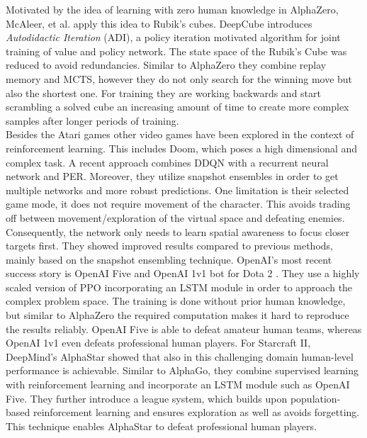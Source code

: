     Motivated by the idea of learning with zero human knowledge in AlphaZero, McAleer, et al. \cite{McAleer2018} apply this idea to Rubik's cubes. 
    DeepCube introduces \textit{Autodidactic Iteration} (ADI), a policy iteration motivated algorithm for joint training of value and policy network.
    The state space of the Rubik's Cube was reduced to avoid redundancies.
    Similar to AlphaZero they combine replay memory and MCTS, however they do not only search for the winning move but also the shortest one.
    For training they are working backwards and start scrambling a solved cube an increasing amount of time to create more complex samples after longer periods of training.\\
    Besides the Atari games other video games have been explored in the context of reinforcement learning. 
    This includes Doom, which poses a high dimensional and complex task.
   	A recent approach \cite{Schulze2018} combines DDQN with a recurrent neural network and PER.
    Moreover, they utilize snapshot ensembles in order to get multiple networks and more robust predictions.
    One limitation is their selected game mode, it does not require movement of the character.
    This avoids trading off between movement/exploration of the virtual space and defeating enemies. 
    Consequently, the network only needs to learn spatial awareness to focus closer targets first. 
    They showed improved results compared to previous methods, mainly based on the snapshot ensembling technique.
    OpenAI's most recent success story is OpenAI Five and OpenAI 1v1 bot for Dota 2 \cite{OpenAI2018}.
    They use a highly scaled version of PPO incorporating an LSTM module in order to approach the complex problem space. 
    The training is done without prior human knowledge, but similar to AlphaZero the required computation makes it hard to reproduce the results reliably.
    OpenAI Five is able to defeat amateur human teams, whereas OpenAI 1v1 even defeats professional human players.  
    For Starcraft II, DeepMind's AlphaStar \cite{Vinyals2019} showed that also in this challenging domain human-level performance is achievable.
    Similar to AlphaGo, they combine supervised learning with reinforcement learning and incorporate an LSTM module such as OpenAI Five.
    They further introduce a league system, which builds upon population-based reinforcement learning and ensures exploration as well as avoids forgetting. 
    This technique enables AlphaStar to defeat professional human players.
    
